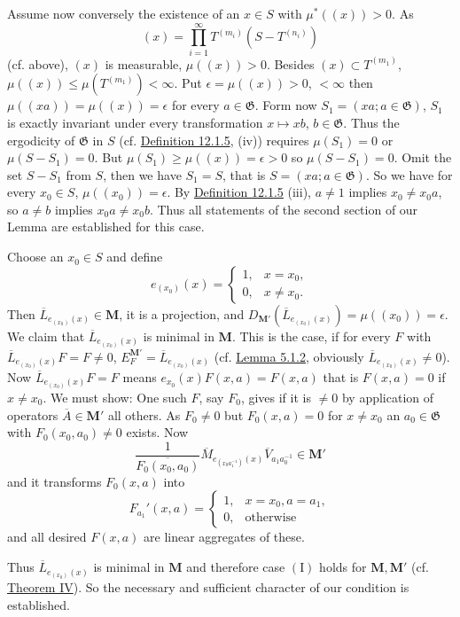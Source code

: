 \documentclass[12pt,b5paper,twoside]{article}
\newcommand{\M}{\mathbf M}
\newcommand{\defref}[1]{\hyperref[def:#1]{Definition #1}}
\newcommand{\lemref}[1]{\hyperref[lem:#1]{Lemma #1}}
\newcommand{\thmref}[1]{\hyperref[thm:#1]{Theorem #1}}
\begin{document}
Assume now conversely the existence of an $x\in S$ with $\mu^*((x))>0$. As
\[
 (x)=\prod_{i=1}^\infty T^{(m_i)}(S-T^{(n_i)})
\]
(cf. above), $(x)$ is measurable, $\mu((x))>0$. Besides
$(x)\subset T^{(m_1)}$, $\mu((x))\leq\mu(T^{(m_1)})<\infty$. Put
$\epsilon=\mu((x))>0$, $<\infty$ then
$\mu((xa))=\mu((x))=\epsilon$ for every $a\in\mathfrak G$. Form now
$S_1=(xa;a\in\mathfrak G)$, $S_1$ is exactly invariant under every
transformation $x\mapsto xb$, $b\in\mathfrak G$. Thus the ergodicity of
$\mathfrak G$ in $S$ (cf. \defref{12.1.5}, (iv)) requires
$\mu(S_1)=0$ or $\mu(S-S_1)=0$. But
$\mu(S_1)\geq\mu((x))=\epsilon>0$ so $\mu(S-S_1)=0$. Omit the set $S-S_1$
from $S$, then we have $S_1=S$, that is $S=(xa;a\in\mathfrak G)$. So we
have for every $x_0\in S$, $\mu((x_0))=\epsilon$. By \defref{12.1.5} (iii),
$a\neq1$ implies $x_0\neq x_0a$, so $a\neq b$ implies $x_0a\neq x_0b$.
Thus all statements of the second section of our Lemma are established for
this case.

Choose an $x_0\in S$ and define
\[
 e_{(x_0)}(x)=\begin{cases}
  1,&x=x_0,\\
  0,&x\neq x_0.
 \end{cases}
\]
Then $\overline L_{e_{(x_0)}(x)}\in\M$, it is a projection, and
$D_{\M'}(\overline L_{e_{(x_0)}(x)})=\mu((x_0))=\epsilon$. We claim that
$\overline L_{e_{(x_0)}(x)}$ is minimal in $\M$. This is the case, if for every
$F$ with $\overline L_{e_{(x_0)}(x)}F=F\neq0$,
$E_F^{\M'}=\overline L_{e_{(x_0)}(x)}$ (cf. \lemref{5.1.2}, obviously
$\overline L_{e_{(x_0)}(x)}\neq0$). Now
$\overline L_{e_{(x_0)}(x)}F=F$ means
$e_{x_0}(x)F(x,a)=F(x,a)$ that is $F(x,a)=0$ if $x\neq x_0$. We must show:
One such $F$, say $F_0$, gives if it is $\neq0$ by application of operators
$\overline A\in\M'$ all others. As $F_0\neq0$ but $F_0(x,a)=0$ for
$x\neq x_0$ an $a_0\in\mathfrak G$ with $F_0(x_0,a_0)\neq0$ exists. Now
\[
 \frac1{\overline{F_0(x_0,a_0)}}
 \overline M_{e_{(x_0a_1^{-1})}(x)}\overline V_{a_1a_0^{-1}}\in\M'
\]
and it transforms $F_0(x,a)$ into
\[
 F_{a_1}'(x,a)=\begin{cases}
  1,&x=x_0, a=a_1,\\
  0,&\text{otherwise}
 \end{cases}
\]
and all desired $F(x,a)$ are linear aggregates of these.

Thus $\overline L_{e_{(x_0)}(x)}$ is minimal in $\M$ and therefore case
$(\mathrm I)$ holds for $\M,\M'$ (cf. \thmref{IV}). So the necessary and
sufficient character of our condition is established.
\end{document}
